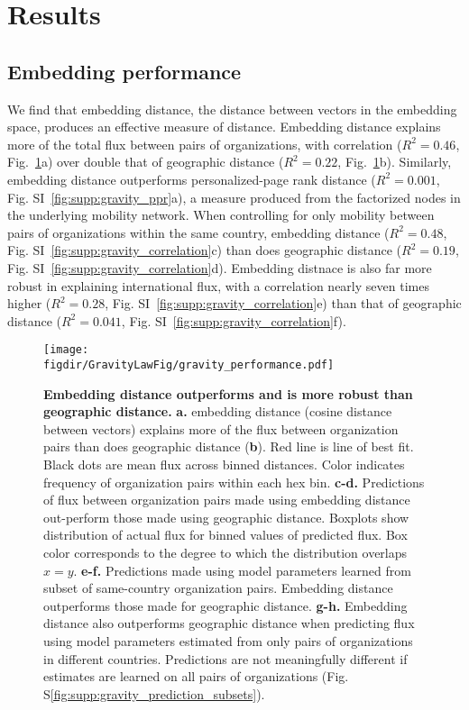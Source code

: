 \documentclass[12pt]{article} %
\def\figdir{../Figs}
\begin{document}
\section{Results}\label{sec:results} %

%
%
\subsection*{Embedding performance}

We find that embedding distance, the distance between vectors in the embedding space, produces an effective measure of distance.
Embedding distance explains more of the total flux between pairs of organizations, with correlation ($R^{2} = 0.46$, Fig.~\ref{fig:gravity_performance}a) over double that of geographic distance ($R^{2} = 0.22$, Fig.~\ref{fig:gravity_performance}b).
Similarly, embedding distance outperforms personalized-page rank distance ($R^{2} = 0.001$, Fig. SI~\ref{fig:supp:gravity_ppr}a), a measure produced from the factorized nodes in the underlying mobility network. 
When controlling for only mobility between pairs of organizations within the same country, embedding distance ($R^{2} = 0.48$, Fig. SI~\ref{fig:supp:gravity_correlation}c) than does geographic distance ($R^{2} = 0.19$, Fig. SI~\ref{fig:supp:gravity_correlation}d). 
Embedding distnace is also far more robust in explaining international flux, with a correlation nearly seven times higher ($R^{2} = 0.28$, Fig. SI~\ref{fig:supp:gravity_correlation}e) than that of geographic distance ($R^{2} = 0.041$, Fig. SI~\ref{fig:supp:gravity_correlation}f). 

%
%
\begin{figure}[h!]
	\centering
	\label{fig:gravity_performance}
	\texttt{[image: \\figdir/GravityLawFig/gravity\_performance.pdf]}
	\caption{
		\textbf{Embedding distance outperforms and is more robust than geographic distance.}
		\textbf{a.} embedding distance (cosine distance between vectors) explains more of the flux between organization pairs than does geographic distance (\textbf{b}). 
		Red line is line of best fit. 
		Black dots are mean flux across binned distances.
		Color indicates frequency of organization pairs within each hex bin.
		\textbf{c-d.} Predictions  of flux between organization pairs made using embedding distance out-perform those made using geographic distance. 
		Boxplots show distribution of actual flux for binned values of predicted flux.
		Box color corresponds to the degree to which the distribution overlaps $x = y$.
		\textbf{e-f.} Predictions made using model parameters learned from subset of same-country organization pairs. 
		Embedding distance outperforms those made for geographic distance.
		\textbf{g-h.} Embedding distance also outperforms geographic distance when predicting flux using model parameters estimated from only pairs of organizations in different countries. 
		Predictions are not meaningfully different if estimates are learned on all pairs of organizations (Fig. S\ref{fig:supp:gravity_prediction_subsets}).
	}
\end{figure}
\end{document}

